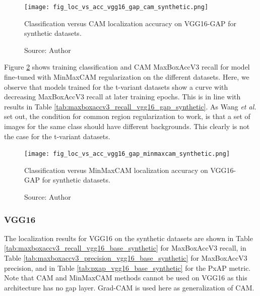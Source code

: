 \begin{figure}[ht]
    \begin{center}       
    \texttt{[image: fig\_loc\_vs\_acc\_vgg16\_gap\_cam\_synthetic.png]}
    \caption[Classification versus CAM localization accuracy on VGG16-GAP for synthetic datasets]{Classification versus CAM localization accuracy on VGG16-GAP for synthetic datasets.}
    \caption*{Source: Author}
    \label{fig:loc_vs_acc_vgg16_gap_cam_synthetic}
    \end{center}
\end{figure}

Figure \ref{fig:loc_vs_acc_vgg16_gap_minmaxcam_synthetic} shows training classification and CAM MaxBoxAccV3 recall for model fine-tuned with MinMaxCAM regularization on the different datasets. Here, we observe that models trained for the t-variant datasets show a curve with decreasing MaxBoxAccV3 recall at later training epochs. This is in line with results in Table \ref{tab:maxboxaccv3_recall_vgg16_gap_synthetic}. As Wang \textit{et al.} \cite{wang2021minmaxcam} set out, the condition for common region regularization to work, is that a set of images for the same class should have different backgrounds. This clearly is not the case for the t-variant datasets.

\begin{figure}[ht]
    \begin{center}       
    \texttt{[image: fig\_loc\_vs\_acc\_vgg16\_gap\_minmaxcam\_synthetic.png]}
    \caption[Classification versus MinMaxCAM localization accuracy on VGG16-GAP for synthetic datasets]{Classification versus MinMaxCAM localization accuracy on VGG16-GAP for synthetic datasets.}
    \caption*{Source: Author}
    \label{fig:loc_vs_acc_vgg16_gap_minmaxcam_synthetic}
    \end{center}
\end{figure}

\subsubsection{VGG16}
The localization results for VGG16 on the synthetic datasets are shown in Table \ref{tab:maxboxaccv3_recall_vgg16_base_synthetic} for MaxBoxAccV3 recall, in Table \ref{tab:maxboxaccv3_precision_vgg16_base_synthetic} for MaxBoxAccV3 precision, and in Table \ref{tab:pxap_vgg16_base_synthetic} for the PxAP metric. Note that CAM and MinMaxCAM methods cannot be used on VGG16 as this architecture has no \acrshort{gap} layer. Grad-CAM is used here as generalization of CAM.

